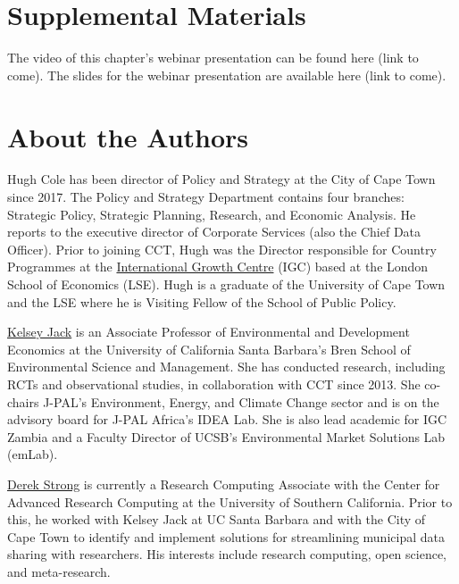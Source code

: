 \hypertarget{supplemental-materials}{%
\section*{Supplemental Materials}\label{supplemental-materials}}

The video of this chapter's webinar presentation can be found here (link to come). The slides for the webinar presentation are available here (link to come).

\hypertarget{about-the-authors-7}{%
\section*{About the Authors}\label{about-the-authors-7}}

Hugh Cole has been director of Policy and Strategy at the City of Cape Town since 2017. The Policy and Strategy Department contains four branches: Strategic Policy, Strategic Planning, Research, and Economic Analysis. He reports to the executive director of Corporate Services (also the Chief Data Officer). Prior to joining CCT, Hugh was the Director responsible for Country Programmes at the \href{http://www.theigc.org}{International Growth Centre} (IGC) based at the London School of Economics (LSE). Hugh is a graduate of the University of Cape Town and the LSE where he is Visiting Fellow of the School of Public Policy.

\href{http://kelseyjack.bren.ucsb.edu/}{Kelsey Jack} is an Associate Professor of Environmental and Development Economics at the University of California Santa Barbara's Bren School of Environmental Science and Management. She has conducted research, including RCTs and observational studies, in collaboration with CCT since 2013. She co-chairs J-PAL's Environment, Energy, and Climate Change sector and is on the advisory board for J-PAL Africa's IDEA Lab. She is also lead academic for IGC Zambia and a Faculty Director of UCSB's Environmental Market Solutions Lab (emLab).

\href{https://drkrynstrng.gitlab.io/}{Derek Strong} is currently a Research Computing Associate with the Center for Advanced Research Computing at the University of Southern California. Prior to this, he worked with Kelsey Jack at UC Santa Barbara and with the City of Cape Town to identify and implement solutions for streamlining municipal data sharing with researchers. His interests include research computing, open science, and meta-research.

